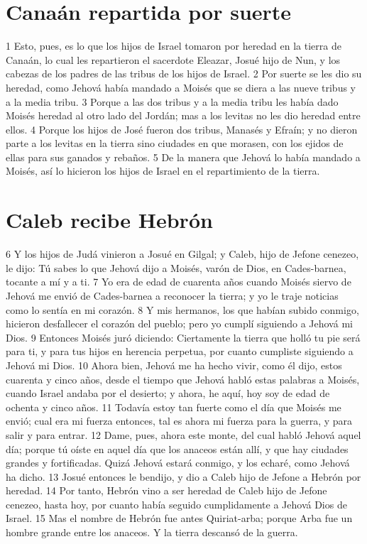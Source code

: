 \section*{Canaán repartida por suerte}


1 Esto, pues, es lo que los hijos de Israel tomaron por heredad en la tierra de Canaán, lo cual les repartieron el sacerdote Eleazar, Josué hijo de Nun, y los cabezas de los padres de las tribus de los hijos de Israel.
2 Por suerte se les dio su heredad, como Jehová había mandado a Moisés que se diera a las nueve tribus y a la media tribu. 
3 Porque a las dos tribus y a la media tribu les había dado Moisés heredad al otro lado del Jordán; mas a los levitas no les dio heredad entre ellos.
4 Porque los hijos de José fueron dos tribus, Manasés y Efraín; y no dieron parte a los levitas en la tierra sino ciudades en que morasen, con los ejidos de ellas para sus ganados y rebaños.
5 De la manera que Jehová lo había mandado a Moisés, así lo hicieron los hijos de Israel en el repartimiento de la tierra.
\section*{Caleb recibe Hebrón}

6 Y los hijos de Judá vinieron a Josué en Gilgal; y Caleb, hijo de Jefone cenezeo, le dijo: Tú sabes lo que Jehová dijo a Moisés, varón de Dios, en Cades-barnea, tocante a mí y a ti. 
7 Yo era de edad de cuarenta años cuando Moisés siervo de Jehová me envió de Cades-barnea a reconocer la tierra; y yo le traje noticias como lo sentía en mi corazón. 
8 Y mis hermanos, los que habían subido conmigo, hicieron desfallecer el corazón del pueblo; pero yo cumplí siguiendo a Jehová mi Dios.
9 Entonces Moisés juró diciendo: Ciertamente la tierra que holló tu pie será para ti, y para tus hijos en herencia perpetua, por cuanto cumpliste siguiendo a Jehová mi Dios. 
10 Ahora bien, Jehová me ha hecho vivir, como él dijo, estos cuarenta y cinco años, desde el tiempo que Jehová habló estas palabras a Moisés, cuando Israel andaba por el desierto; y ahora, he aquí, hoy soy de edad de ochenta y cinco años.
11 Todavía estoy tan fuerte como el día que Moisés me envió; cual era mi fuerza entonces, tal es ahora mi fuerza para la guerra, y para salir y para entrar.
12 Dame, pues, ahora este monte, del cual habló Jehová aquel día; porque tú oíste en aquel día que los anaceos están allí, y que hay ciudades grandes y fortificadas. Quizá Jehová estará conmigo, y los echaré, como Jehová ha dicho.
13 Josué entonces le bendijo, y dio a Caleb hijo de Jefone a Hebrón por heredad.
14 Por tanto, Hebrón vino a ser heredad de Caleb hijo de Jefone cenezeo, hasta hoy, por cuanto había seguido cumplidamente a Jehová Dios de Israel.
15 Mas el nombre de Hebrón fue antes Quiriat-arba; porque Arba fue un hombre grande entre los anaceos. Y la tierra descansó de la guerra.

